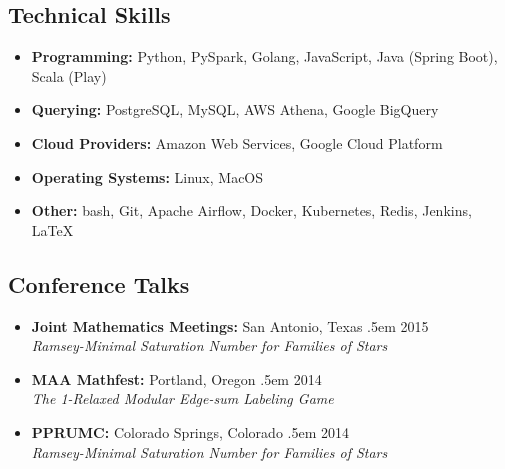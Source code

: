 \documentclass[a4paper]{article}
\makeatletter
\newcommand \brentfill {
  \tiny
  \leavevmode \cleaders 
  \hb@xt@ .5em{\hss \textperiodcentered \hss }\hfill \kern \z@
  \normalsize
}
\newcommand{\bbull}{\ding{118}}
\makeatother
\begin{document}
\subsection*{Technical Skills \hrulefill}
\begin{itemize}
  \item[\bbull] \textbf{Programming:}  Python, PySpark, Golang,
    JavaScript, Java (Spring Boot), Scala (Play)
  \item[\bbull] \textbf{Querying:} PostgreSQL, MySQL, AWS Athena, Google
    BigQuery
  \item[\bbull] \textbf{Cloud Providers:} Amazon Web Services, Google
    Cloud Platform
  \item[\bbull] \textbf{Operating Systems:}  Linux, MacOS
  \item[\bbull] \textbf{Other:}  bash, Git, Apache Airflow, Docker, Kubernetes,
    Redis, Jenkins, \LaTeX
\end{itemize}


\subsection*{Conference Talks \hrulefill}
\begin{itemize}
  \item[\bbull] \textbf{Joint Mathematics Meetings:}
    San Antonio, Texas \brentfill{} 2015 \\
    \emph{Ramsey-Minimal Saturation Number for Families of Stars}

  \item[\bbull] \textbf{MAA Mathfest:}
    Portland, Oregon \brentfill{} 2014 \\
    \emph{The 1-Relaxed Modular Edge-sum Labeling Game}

  \item[\bbull] \textbf{PPRUMC:}
    Colorado Springs, Colorado \brentfill{} 2014 \\
    \emph{Ramsey-Minimal Saturation Number for Families of Stars}
\end{itemize}

\begingroup
\renewcommand{\section}[2]{\subsection#1{#2}}%
\nocite{brandt:local,butler:forest}


\endgroup
\end{document}
